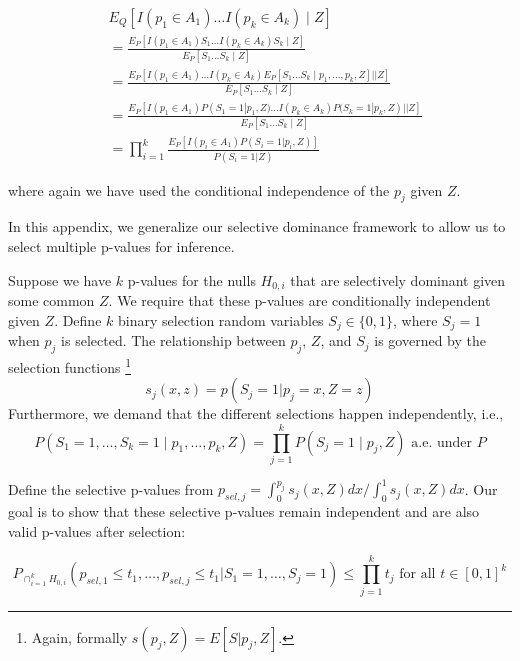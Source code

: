 \documentclass{article}
\begin{document}
\begin{appendix}
\begin{align*}
    &E_Q[ I(p_1 \in A_1) \dots I(p_k \in A_k) \mid Z] \\
    &= \frac{E_P[ I(p_1 \in A_1)S_1 \dots I(p_k \in A_k)S_k \mid Z] }{E_P[ S_1\dots S_k \mid Z]}\\
    &= \frac{E_P[I(p_1 \in A_1) \dots I(p_k \in A_k) E_P[ S_1\dots S_k \mid p_1, \dots, p_k, Z] | \mid Z ]  }{E_P[ S_1\dots S_k \mid Z]}\\
    &= \frac{E_P[I(p_1 \in A_1) P(S_1= 1 | p_1, Z) \dots I(p_k \in A_k) P(S_k= 1 | p_k, Z)  | \mid Z ]  }{E_P[ S_1\dots S_k \mid Z]}\\
    &= \prod_{i=1}^k \frac{E_P[ I(p_i \in A_1) P(S_i= 1 | p_i, Z)]}{P(S_i= 1 | Z)}
\end{align*}

where again we have used the conditional independence of the $p_j$ given $Z$. 
\fi 


In this appendix, we generalize our selective dominance framework to allow us to select multiple p-values for inference. 

Suppose we have $k$ p-values for the nulls $H_{0, i}$ that are selectively dominant given some common $Z$. We require that these p-values are conditionally independent given $Z$. Define $k$ binary selection random variables $S_j \in \{0, 1\}$, where $S_j = 1$ when $p_j$ is selected. The relationship between $p_j$, $Z$, and $S_j$ is governed by the selection functions \footnote{Again, formally $s(p_j, Z) = E[S | p_j, Z]$.} 
\begin{equation*}
    s_j(x, z) = p(S_j = 1 | p_j = x, Z=z)
\end{equation*} 
Furthermore, we demand that the different selections happen independently, i.e., 
\begin{equation}
    \label{eq:mult_indep}
    P(S_1 = 1, \dots, S_k = 1 \mid p_1, \dots, p_k, Z) = \prod_{j = 1}^k P(S_j = 1 \mid p_j, Z) \text{ a.e. under } P 
\end{equation} 

Define the selective p-values from  $p_{sel, j} = \int_0^{p_j} s_j(x, Z)dx/\int_0^1 s_j(x, Z) dx$. Our goal is to show that these selective p-values remain independent and are also valid p-values after selection:

\begin{equation}
    \label{eq:mult_error_control}
    P_{\cap_{i=1}^k H_{0, i}}(p_{sel, 1} \leq t_1, \dots, p_{sel, j} \leq t_1 | S_1=1, \dots, S_j=1) \leq \prod_{j=1}^k t_j \text{ for all } t \in [0,1 ]^k 
\end{equation}


\end{appendix}
\end{document}
